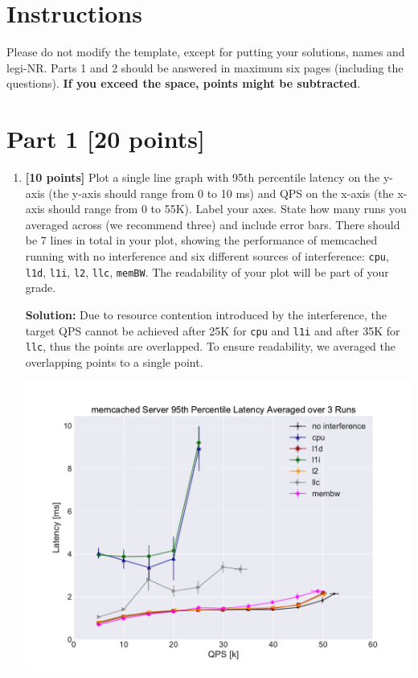 \documentclass[11pt]{article}
\begin{document}

\section*{Instructions}
Please do not modify the template, except for putting your solutions, names and legi-NR.
Parts 1 and 2 should be answered in maximum six pages (including the questions).
\textbf{If you exceed the space, points might be subtracted}.
\newpage
\section*{Part 1 [20 points]}
\begin{enumerate}
            \item \textbf{[10 points]} Plot a single line graph with 95th percentile latency on the y-axis (the
            y-axis should range from 0 to 10 ms) and QPS on the x-axis (the x-axis should range from 0 to 55K).
            Label your axes. State how many runs you averaged across (we recommend three) and include error bars.
            There should be 7 lines in total in your plot, showing the performance of memcached running with no
            interference and six different sources of interference: \texttt{cpu}, \texttt{l1d}, \texttt{l1i}, \texttt{l2}, \texttt{llc}, \texttt{memBW}. The readability of your
            plot will be part of your grade.
            
            \textbf{Solution:} Due to resource contention introduced by the interference, the target QPS cannot be achieved after 25K for \texttt{cpu} and \texttt{l1i} and after 35K for \texttt{llc}, thus the points are overlapped. To ensure readability, we averaged the overlapping points to a single point.
            
            \begin{center}
            {\includegraphics[scale=0.5]{p95.pdf}}
            \end{center}
            

\end{enumerate}
\end{document}
